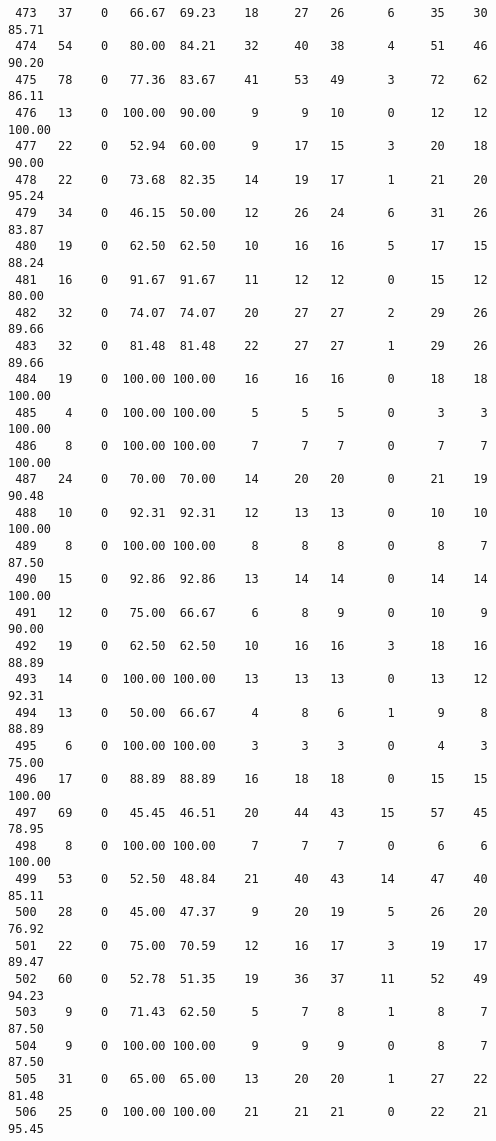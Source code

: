 \begin{verbatim}
 473   37    0   66.67  69.23    18     27   26      6     35    30    85.71
 474   54    0   80.00  84.21    32     40   38      4     51    46    90.20
 475   78    0   77.36  83.67    41     53   49      3     72    62    86.11
 476   13    0  100.00  90.00     9      9   10      0     12    12   100.00
 477   22    0   52.94  60.00     9     17   15      3     20    18    90.00
 478   22    0   73.68  82.35    14     19   17      1     21    20    95.24
 479   34    0   46.15  50.00    12     26   24      6     31    26    83.87
 480   19    0   62.50  62.50    10     16   16      5     17    15    88.24
 481   16    0   91.67  91.67    11     12   12      0     15    12    80.00
 482   32    0   74.07  74.07    20     27   27      2     29    26    89.66
 483   32    0   81.48  81.48    22     27   27      1     29    26    89.66
 484   19    0  100.00 100.00    16     16   16      0     18    18   100.00
 485    4    0  100.00 100.00     5      5    5      0      3     3   100.00
 486    8    0  100.00 100.00     7      7    7      0      7     7   100.00
 487   24    0   70.00  70.00    14     20   20      0     21    19    90.48
 488   10    0   92.31  92.31    12     13   13      0     10    10   100.00
 489    8    0  100.00 100.00     8      8    8      0      8     7    87.50
 490   15    0   92.86  92.86    13     14   14      0     14    14   100.00
 491   12    0   75.00  66.67     6      8    9      0     10     9    90.00
 492   19    0   62.50  62.50    10     16   16      3     18    16    88.89
 493   14    0  100.00 100.00    13     13   13      0     13    12    92.31
 494   13    0   50.00  66.67     4      8    6      1      9     8    88.89
 495    6    0  100.00 100.00     3      3    3      0      4     3    75.00
 496   17    0   88.89  88.89    16     18   18      0     15    15   100.00
 497   69    0   45.45  46.51    20     44   43     15     57    45    78.95
 498    8    0  100.00 100.00     7      7    7      0      6     6   100.00
 499   53    0   52.50  48.84    21     40   43     14     47    40    85.11
 500   28    0   45.00  47.37     9     20   19      5     26    20    76.92
 501   22    0   75.00  70.59    12     16   17      3     19    17    89.47
 502   60    0   52.78  51.35    19     36   37     11     52    49    94.23
 503    9    0   71.43  62.50     5      7    8      1      8     7    87.50
 504    9    0  100.00 100.00     9      9    9      0      8     7    87.50
 505   31    0   65.00  65.00    13     20   20      1     27    22    81.48
 506   25    0  100.00 100.00    21     21   21      0     22    21    95.45

\end{verbatim}
